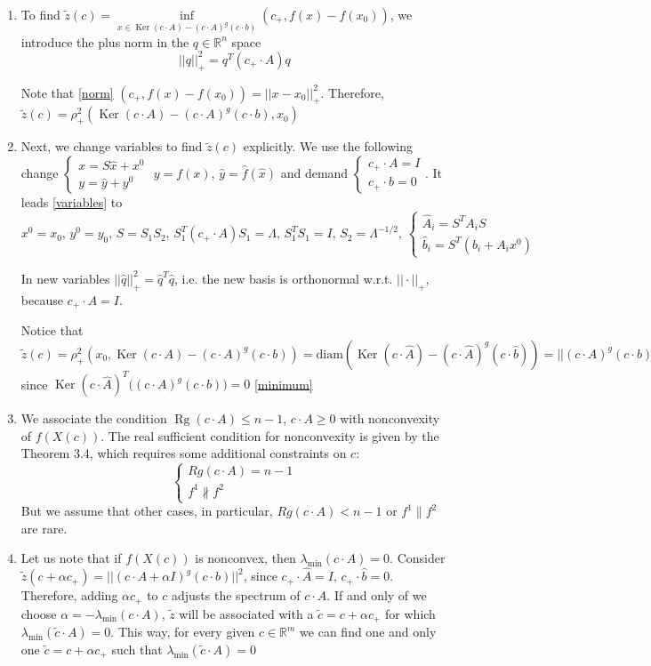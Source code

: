 \documentclass[a4paper]{article}
\DeclareMathOperator{\Rg}{Rg}
\DeclareMathOperator{\Ker}{Ker}
\begin{document}
\begin{enumerate}
\item To find $\tilde{z}(c)=\inf\limits_{x\in \Ker(c\cdot A)-(c\cdot A)^g(c\cdot b)}(c_+,f(x)-f(x_0))$, we introduce the plus norm in the $q\in\mathbb{R}^n$ space
$$||q||^2_+=q^T(c_+\cdot A)q$$

Note that \ref{norm} $(c_+,f(x)-f(x_0))=||x-x_0||_+^2$.
Therefore, $\tilde{z}(c)=\rho_+^2(\Ker(c\cdot A)-(c\cdot A)^g(c\cdot b),x_0)$
\item Next, we change variables to find $\tilde{z}(c)$ explicitly. We use the following change
$\begin{cases}
x=S\hat{x}+x^0\\
y=\hat{y}+y^0
\end{cases}$ $y=f(x)$, $\hat{y}=\hat{f}(\hat{x})$ and demand $\begin{cases}
c_+\cdot A=I\\
c_+\cdot b=0
\end{cases}$. It leads \ref{variables} to
$$x^0=x_0,\,y^0=y_0,\,S=S_1S_2,\, S_1^T(c_+\cdot A)S_1=\Lambda,\,S_1^TS_1=I,\,S_2=\Lambda^{-1/2},\,\begin{cases}
\hat{A}_i=S^TA_iS\\
\hat{b}_i=S^T(b_i+A_ix^0)
\end{cases}$$

In new variables $||\hat{q}||_+^2=\hat{q}^T\hat{q}$, i.e. the new basis is orthonormal w.r.t. $||\cdot||_+$, because $c_+\cdot A=I$.


Notice that $\tilde{z}(c)=\rho_+^2(x_0,\Ker (c\cdot A)-(c\cdot A)^g(c\cdot b))=\mathrm{diam}(\Ker(c\cdot \hat{A})-(c\cdot \hat{A})^g(c\cdot \hat{b}))=||(c\cdot A)^g(c\cdot b)||^2$ since $\Ker(c\cdot \hat{A})^T\big((c\cdot A)^g(c\cdot b)\big)=0$ \ref{minimum}

\item We associate the condition $\Rg(c\cdot A)\leqslant n-1$, $c\cdot A\geqslant 0$ with nonconvexity of $f(X(c))$. The real sufficient condition for nonconvexity is given by the Theorem 3.4, which requires some additional constraints on $c$:
$$
\begin{cases}
Rg(c\cdot A)=n-1\\
f^1\nparallel f^2
\end{cases}
$$
But we assume that other cases, in particular, $Rg(c\cdot A)<n-1$ or $f^1\parallel f^2$ are rare.

\item Let us note that if $f(X(c))$ is nonconvex, then $\lambda_{\min}(c\cdot A)=0$. Consider $\tilde{z}(c+\alpha c_+)=||(c\cdot A+\alpha I)^g(c\cdot b)||^2$, since $c_+\cdot\hat{A}=I,\,c_+\cdot\hat{b}=0$. Therefore, adding $\alpha c_+$ to $c$ adjusts the spectrum of $c\cdot A$. If and only of we choose $\alpha=-\lambda_{\min}(c\cdot A)$, $\tilde{z}$ will be associated with a $\tilde{c}=c+\alpha c_+$ for which $\lambda_{\min}(\tilde{c}\cdot A)=0$. This way, for every given $c\in\mathbb{R}^m$ we can find one and only one $\tilde{c}=c+\alpha c_+$ such that $\lambda_{\min}(\tilde{c}\cdot A)=0$


\end{enumerate}
\end{document}
